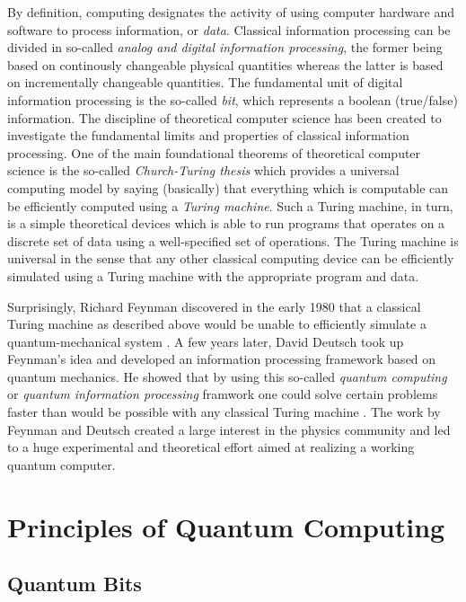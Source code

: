 By definition, computing designates the activity of using computer hardware and software to process information, or {\it data}. Classical information processing can be divided in so-called {\it analog and digital information processing}, the former being based on continously changeable physical quantities whereas the latter is based on incrementally changeable quantities. The fundamental unit of digital information processing is the so-called {\it bit}, which represents a boolean (true/false) information. The discipline of theoretical computer science has been created to investigate the fundamental limits and properties of classical information processing. One of the main foundational theorems of theoretical computer science is the so-called {\it Church-Turing thesis} which provides a universal computing model by saying (basically) that everything which is computable can be efficiently computed using a {\it Turing machine}. Such a Turing machine, in turn, is a simple theoretical devices which is able to run programs that operates on a discrete set of data using a well-specified set of operations. The Turing machine is universal in the sense that any other classical computing device can be efficiently simulated using a Turing machine with the appropriate program and data.

\smallskip

Surprisingly, Richard Feynman discovered in the early 1980 that a classical Turing machine as described above would be unable to efficiently simulate a quantum-mechanical system \citep{feynman_simulating_1982}. A few years later, David Deutsch took up Feynman's idea and developed an information processing framework based on quantum mechanics. He showed that by using this so-called {\it quantum computing} or {\it quantum information processing} framwork one could solve certain problems faster than would be possible with any classical Turing machine \citep{deutsch_quantum_1985}. The work by Feynman and Deutsch created a large interest in the physics community and led to a huge experimental and theoretical effort aimed at realizing a working quantum computer. 

\section{Principles of Quantum Computing}

\subsection{Quantum Bits}

